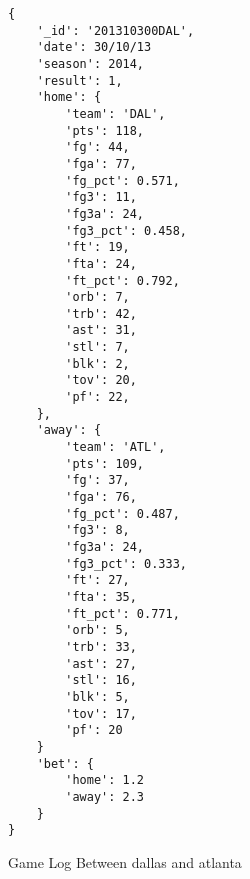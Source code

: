 \begin{listing}
\begin{verbatim}
{
    '_id': '201310300DAL', 
    'date': 30/10/13 
    'season': 2014, 
    'result': 1, 
    'home': {
        'team': 'DAL', 
        'pts': 118, 
        'fg': 44, 
        'fga': 77, 
        'fg_pct': 0.571, 
        'fg3': 11, 
        'fg3a': 24, 
        'fg3_pct': 0.458, 
        'ft': 19, 
        'fta': 24, 
        'ft_pct': 0.792, 
        'orb': 7, 
        'trb': 42, 
        'ast': 31, 
        'stl': 7, 
        'blk': 2, 
        'tov': 20, 
        'pf': 22,
    }, 
    'away': {
        'team': 'ATL', 
        'pts': 109, 
        'fg': 37, 
        'fga': 76, 
        'fg_pct': 0.487, 
        'fg3': 8, 
        'fg3a': 24, 
        'fg3_pct': 0.333, 
        'ft': 27, 
        'fta': 35, 
        'ft_pct': 0.771, 
        'orb': 5, 
        'trb': 33, 
        'ast': 27, 
        'stl': 16, 
        'blk': 5, 
        'tov': 17, 
        'pf': 20
    }
    'bet': {
        'home': 1.2
        'away': 2.3
    }
}

\end{verbatim}
\caption{Game Log Between dallas and atlanta} 
\label{json-example}
\end{listing}